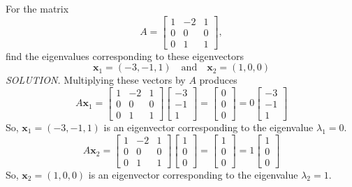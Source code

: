 \documentclass{article}
\begin{document}
    For the matrix \[A =
        \begin{bmatrix}
        1 & -2 & 1 \\
        0 & 0 & 0 \\
        0 & 1 & 1
    \end{bmatrix},  \]
    find the eigenvalues corresponding to these eigenvectors
    \[ \textbf{x}_1 = (-3, -1, 1) \quad \text{and} \quad \textbf{x}_2 = (1,0,0) \]
    \textit{\textcolor{blue5}{SOLUTION.}} Multiplying these vectors by $A$ produces
    \[A \textbf{x}_1 = \begin{bmatrix}
        1 & -2 & 1 \\
        0 & 0 & 0 \\
        0 & 1 & 1
    \end{bmatrix} \begin{bmatrix}
        -3 \\ -1 \\ 1
    \end{bmatrix} = \begin{bmatrix}
        0 \\ 0 \\ 0 
    \end{bmatrix} = 0 \begin{bmatrix}
        -3 \\ -1 \\ 1
    \end{bmatrix}\]
    So, $ \textbf{x}_1 = (-3,-1,1)$ is an eigenvector corresponding to the eigenvalue $\lambda_1 = 0$.
    \[A \textbf{x}_2 = \begin{bmatrix}
        1 & -2 & 1 \\
        0 & 0 & 0 \\
        0 & 1 & 1
    \end{bmatrix} \begin{bmatrix}
       1 \\ 0 \\ 0 
    \end{bmatrix} = \begin{bmatrix}
        1 \\ 0 \\ 0 
    \end{bmatrix} = 1 \begin{bmatrix}
        1 \\ 0 \\ 0
    \end{bmatrix}\]
    So, $ \textbf{x}_2 = (1,0,0)$ is an eigenvector corresponding to the eigenvalue $\lambda_2 = 1$.
\end{document}

